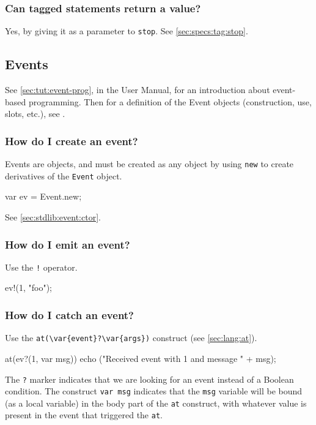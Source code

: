 \subsubsection{Can tagged statements return a value?}
Yes, by giving it as a parameter to \lstinline{stop}.  See
\autoref{sec:specs:tag:stop}.


\subsection{Events}

See \autoref{sec:tut:event-prog}, in the \us User Manual, for an
introduction about event-based programming.  Then for a definition of
the Event objects (construction, use, slots, etc.), see
.

\subsubsection{How do I create an event?}
Events are objects, and must be created as any object by using
\lstinline{new} to create derivatives of the \lstinline{Event} object.

\begin{urbiunchecked}
var ev = Event.new;
\end{urbiunchecked}

See \autoref{sec:stdlib:event:ctor}.

\subsubsection{How do I emit an event?}
Use the \lstinline|!| operator.

\begin{urbiunchecked}
ev!(1, "foo");
\end{urbiunchecked}

\subsubsection{How do I catch an event?}
Use the \lstinline|at(\var{event}?\var{args})| construct (see
\autoref{sec:lang:at}).

\begin{urbiunchecked}
at(ev?(1, var msg))
  echo ("Received event with 1 and message " + msg);
\end{urbiunchecked}

The \lstinline{?} marker indicates that we are looking for an event
instead of a Boolean condition. The construct \lstinline{var msg}
indicates that the \lstinline{msg} variable will be bound (as a local
variable) in the body part of the \lstinline{at} construct, with
whatever value is present in the event that triggered the
\lstinline{at}.

